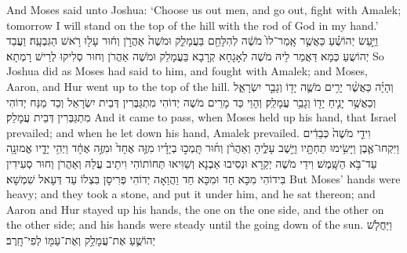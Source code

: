 {And Moses said unto Joshua: ‘Choose us out men, and go out, fight with Amalek; tomorrow I will stand on the top of the hill with the rod of God in my hand.’}{}
{וַיַּ֣עַשׂ יְהוֹשֻׁ֗עַ כַּאֲשֶׁ֤ר אָֽמַר־לוֹ֙ מֹשֶׁ֔ה לְהִלָּחֵ֖ם בַּעֲמָלֵ֑ק וּמֹשֶׁה֙ אַהֲרֹ֣ן וְח֔וּר עָל֖וּ רֹ֥אשׁ הַגִּבְעָֽה׃
}
{וַעֲבַד יְהוֹשֻעַ כְּמָא דַּאֲמַר לֵיהּ מֹשֶׁה לְאָגָחָא קְרָבָא בַּעֲמָלֵק וּמֹשֶׁה אַהֲרֹן וְחוּר סְלִיקוּ לְרֵישׁ רָמְתָא׃}
{So Joshua did as Moses had said to him, and fought with Amalek; and Moses, Aaron, and Hur went up to the top of the hill.}{}
{וְהָיָ֗ה כַּאֲשֶׁ֨ר יָרִ֥ים מֹשֶׁ֛ה יָד֖וֹ וְגָבַ֣ר יִשְׂרָאֵ֑ל וְכַאֲשֶׁ֥ר יָנִ֛יחַ יָד֖וֹ וְגָבַ֥ר עֲמָלֵֽק׃
}
{וְהָוֵי כַּד מָרֵים מֹשֶׁה יְדוֹהִי מִתְגַּבְּרִין דְּבֵית יִשְׂרָאֵל וְכַד מַנַּח יְדוֹהִי מִתְגַּבְּרִין דְּבֵית עֲמָלֵק׃}
{And it came to pass, when Moses held up his hand, that Israel prevailed; and when he let down his hand, Amalek prevailed.}{}
{וִידֵ֤י מֹשֶׁה֙ כְּבֵדִ֔ים וַיִּקְחוּ־אֶ֛בֶן וַיָּשִׂ֥ימוּ תַחְתָּ֖יו וַיֵּ֣שֶׁב עָלֶ֑יהָ וְאַהֲרֹ֨ן וְח֜וּר תָּֽמְכ֣וּ בְיָדָ֗יו מִזֶּ֤ה אֶחָד֙ וּמִזֶּ֣ה אֶחָ֔ד וַיְהִ֥י יָדָ֛יו אֱמוּנָ֖ה עַד־בֹּ֥א הַשָּֽׁמֶשׁ׃
}
{וִידֵי מֹשֶׁה יְקַרָא וּנְסִיבוּ אַבְנָא וְשַׁוִּיאוּ תְּחוֹתוֹהִי וִיתֵיב עֲלַהּ וְאַהֲרֹן וְחוּר סְעִידִין בִּידוֹהִי מִכָּא חַד וּמִכָּא חַד וַהֲוַאָה יְדוֹהִי פְּרִיסָן בִּצְלוֹ עַד דְּעָאל שִׁמְשָׁא׃}
{But Moses’ hands were heavy; and they took a stone, and put it under him, and he sat thereon; and Aaron and Hur stayed up his hands, the one on the one side, and the other on the other side; and his hands were steady until the going down of the sun.}{}
{וַיַּחֲלֹ֧שׁ יְהוֹשֻׁ֛עַ אֶת־עֲמָלֵ֥ק וְאֶת־עַמּ֖וֹ לְפִי־חָֽרֶב׃ \petucha 
{}}
